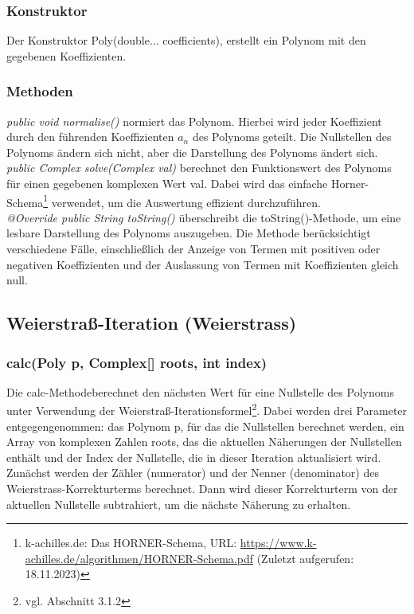 \documentclass[12pt]{article}
\begin{document}
\subsubsection*{Konstruktor}
Der Konstruktor \glqq Poly(double... coefficients)\grqq, erstellt ein Polynom mit den gegebenen Koeffizienten.

\subsubsection*{Methoden}
\textit{public void normalise()} normiert das Polynom. Hierbei wird jeder Koeffizient durch den führenden Koeffizienten $a_n$ des Polynoms geteilt. Die Nullstellen des Polynoms ändern sich nicht, aber die Darstellung des Polynoms ändert sich.\\
\textit{public Complex solve(Complex val)} berechnet den Funktionswert des Polynoms für einen gegebenen komplexen Wert \glqq val\grqq. Dabei wird das einfache Horner-Schema\footnote{
    k-achilles.de: Das HORNER-Schema, URL: \url{https://www.k-achilles.de/algorithmen/HORNER-Schema.pdf} (Zuletzt aufgerufen: 18.11.2023)
} verwendet, um die Auswertung effizient durchzuführen. \\
\textit{@Override public String toString()} überschreibt die \glqq toString()\grqq -Methode, um eine lesbare Darstellung des Polynoms auszugeben. Die Methode berücksichtigt verschiedene Fälle, einschließlich der Anzeige von Termen mit positiven oder negativen Koeffizienten und der Auslassung von Termen mit Koeffizienten gleich null.

\subsection{Weierstraß-Iteration (Weierstrass)}

\subsubsection*{calc(Poly p, Complex[] roots, int index)}
Die \glqq calc-Methode\grqq\space berechnet den nächsten Wert für eine Nullstelle des Polynoms unter Verwendung der Weierstraß-Iterationsformel\footnote{
    vgl. Abschnitt 3.1.2
}. Dabei werden drei Parameter entgegengenommen: das Polynom \glqq p\grqq, für das die Nullstellen berechnet werden, ein Array von komplexen Zahlen \glqq roots\grqq, das die aktuellen Näherungen der Nullstellen enthält und der Index der Nullstelle, die in dieser Iteration aktualisiert wird.\\
Zunächst werden der Zähler (\glqq numerator\grqq) und der Nenner (\glqq denominator\grqq) des Weierstrass-Korrekturterms berechnet. Dann wird dieser Korrekturterm von der aktuellen Nullstelle subtrahiert, um die nächste Näherung zu erhalten.
\end{document}

